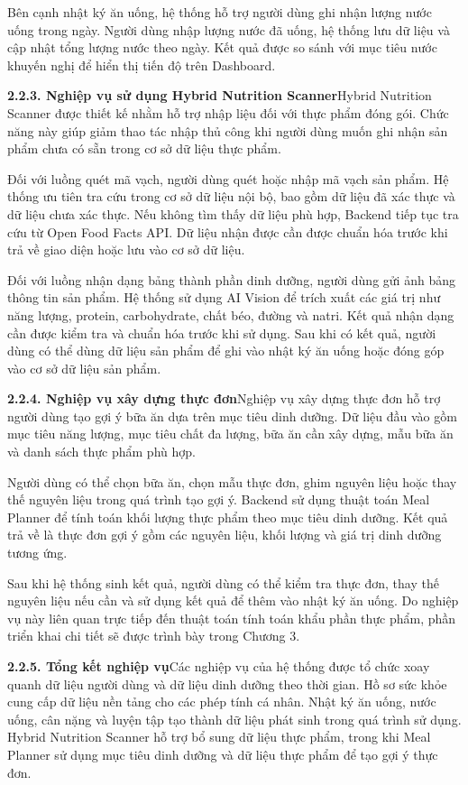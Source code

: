 Bên cạnh nhật ký ăn uống, hệ thống hỗ trợ người dùng ghi nhận lượng nước uống trong ngày. Người dùng nhập lượng nước đã uống, hệ thống lưu dữ liệu và cập nhật tổng lượng nước theo ngày. Kết quả được so sánh với mục tiêu nước khuyến nghị để hiển thị tiến độ trên Dashboard.

\textbf{2.2.3. Nghiệp vụ sử dụng Hybrid Nutrition Scanner}Hybrid Nutrition Scanner được thiết kế nhằm hỗ trợ nhập liệu đối với thực phẩm đóng gói. Chức năng này giúp giảm thao tác nhập thủ công khi người dùng muốn ghi nhận sản phẩm chưa có sẵn trong cơ sở dữ liệu thực phẩm.

Đối với luồng quét mã vạch, người dùng quét hoặc nhập mã vạch sản phẩm. Hệ thống ưu tiên tra cứu trong cơ sở dữ liệu nội bộ, bao gồm dữ liệu đã xác thực và dữ liệu chưa xác thực. Nếu không tìm thấy dữ liệu phù hợp, Backend tiếp tục tra cứu từ Open Food Facts API. Dữ liệu nhận được cần được chuẩn hóa trước khi trả về giao diện hoặc lưu vào cơ sở dữ liệu.

Đối với luồng nhận dạng bảng thành phần dinh dưỡng, người dùng gửi ảnh bảng thông tin sản phẩm. Hệ thống sử dụng AI Vision để trích xuất các giá trị như năng lượng, protein, carbohydrate, chất béo, đường và natri. Kết quả nhận dạng cần được kiểm tra và chuẩn hóa trước khi sử dụng. Sau khi có kết quả, người dùng có thể dùng dữ liệu sản phẩm để ghi vào nhật ký ăn uống hoặc đóng góp vào cơ sở dữ liệu sản phẩm.

\textbf{2.2.4. Nghiệp vụ xây dựng thực đơn}Nghiệp vụ xây dựng thực đơn hỗ trợ người dùng tạo gợi ý bữa ăn dựa trên mục tiêu dinh dưỡng. Dữ liệu đầu vào gồm mục tiêu năng lượng, mục tiêu chất đa lượng, bữa ăn cần xây dựng, mẫu bữa ăn và danh sách thực phẩm phù hợp.

Người dùng có thể chọn bữa ăn, chọn mẫu thực đơn, ghim nguyên liệu hoặc thay thế nguyên liệu trong quá trình tạo gợi ý. Backend sử dụng thuật toán Meal Planner để tính toán khối lượng thực phẩm theo mục tiêu dinh dưỡng. Kết quả trả về là thực đơn gợi ý gồm các nguyên liệu, khối lượng và giá trị dinh dưỡng tương ứng.

Sau khi hệ thống sinh kết quả, người dùng có thể kiểm tra thực đơn, thay thế nguyên liệu nếu cần và sử dụng kết quả để thêm vào nhật ký ăn uống. Do nghiệp vụ này liên quan trực tiếp đến thuật toán tính toán khẩu phần thực phẩm, phần triển khai chi tiết sẽ được trình bày trong Chương 3.

\textbf{2.2.5. Tổng kết nghiệp vụ}Các nghiệp vụ của hệ thống được tổ chức xoay quanh dữ liệu người dùng và dữ liệu dinh dưỡng theo thời gian. Hồ sơ sức khỏe cung cấp dữ liệu nền tảng cho các phép tính cá nhân. Nhật ký ăn uống, nước uống, cân nặng và luyện tập tạo thành dữ liệu phát sinh trong quá trình sử dụng. Hybrid Nutrition Scanner hỗ trợ bổ sung dữ liệu thực phẩm, trong khi Meal Planner sử dụng mục tiêu dinh dưỡng và dữ liệu thực phẩm để tạo gợi ý thực đơn.

